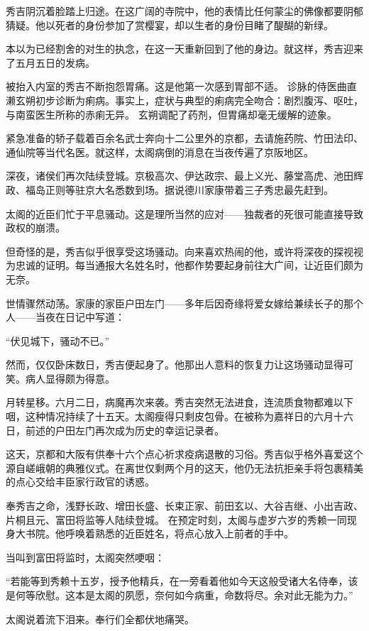 \documentclass[
]{article}
\begin{document}
秀吉阴沉着脸踏上归途。在这广阔的寺院中，他的表情比任何蒙尘的佛像都要阴郁猜疑。他以死者的身份参加了赏樱宴，却以生者的身份目睹了醍醐的新绿。

本以为已经割舍的对生的执念，在这一天重新回到了他的身边。就这样，秀吉迎来了五月五日的发病。

被抬入内室的秀吉不断抱怨胃痛。这是他第一次感到胃部不适。
诊脉的侍医曲直濑玄朔初步诊断为痢病。事实上，症状与典型的痢病完全吻合：剧烈腹泻、呕吐，与南蛮医生所称的赤痢无异。
玄朔调配了药剂，但胃痛却毫无缓解的迹象。

紧急准备的轿子载着百余名武士奔向十二公里外的京都，去请施药院、竹田法印、通仙院等当代名医。就这样，太阁病倒的消息在当夜传遍了京阪地区。

深夜，诸侯们再次陆续登城。京极高次、伊达政宗、最上义光、藤堂高虎、池田辉政、福岛正则等驻京大名悉数到场。据说德川家康带着三子秀忠最先赶到。

太阁的近臣们忙于平息骚动。这是理所当然的应对------独裁者的死很可能直接导致政权的崩溃。

但奇怪的是，秀吉似乎很享受这场骚动。向来喜欢热闹的他，或许将深夜的探视视为忠诚的证明。每当通报大名姓名时，他都作势要起身前往大广间，让近臣们颇为无奈。

世情骤然动荡。家康的家臣户田左门------多年后因奇缘将爱女嫁给兼续长子的那个人------当夜在日记中写道：

``伏见城下，骚动不已。''

然而，仅仅卧床数日，秀吉便起身了。他那出人意料的恢复力让这场骚动显得可笑。病人显得颇为得意。

月转星移。六月二日，病魔再次来袭。秀吉突然无法进食，连流质食物都难以下咽，这种情况持续了十五天。太阁瘦得只剩皮包骨。在被称为嘉祥日的六月十六日，前述的户田左门再次成为历史的幸运记录者。

这天，京都和大阪有供奉十六个点心祈求疫病退散的习俗。秀吉似乎格外喜爱这个源自嵯峨朝的典雅仪式。在离世仅剩两个月的这天，他仍无法抗拒亲手将包裹精美的点心交给丰臣家行政官的诱惑。

奉秀吉之命，浅野长政、增田长盛、长束正家、前田玄以、大谷吉继、小出吉政、片桐且元、富田将监等人陆续登城。
在预定时刻，太阁与虚岁六岁的秀赖一同现身大书院。他呼唤着熟悉的近臣姓名，将点心放入上前者的手中。

当叫到富田将监时，太阁突然哽咽：

``若能等到秀赖十五岁，授予他精兵，在一旁看着他如今天这般受诸大名侍奉，该是何等欣慰。这本是太阁的夙愿，奈何如今病重，命数将尽。余对此无能为力。''

太阁说着流下泪来。奉行们全都伏地痛哭。
\end{document}
